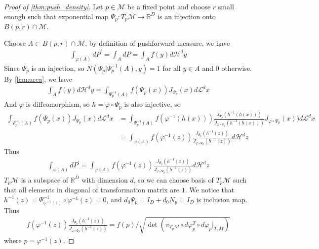 \begin{proof}[Proof of \cref{thm:push_density}]
	Let $p \in \mathcal{M}$ be a fixed point and choose $r$ small enough such that exponential map $\Psi_p: T_p \mathcal{M} \rightarrow \mathbb{R}^D$ is an injection onto $B(p,r)\cap \mathcal{M}$. 
	
	Choose $A \subset B(p,r)\cap \mathcal{M}$, by definition of pushforward measure, we have
	\begin{align*}
		\int_{\varphi(A)} d P^\prime=\int_A dP =\int_A f(y) d\mathcal{H}^d y
	\end{align*}
	Since $\Psi_p$ is an injection, so $N(\Psi_p|\Psi_p^{-1}(A),y)=1$ for all $y \in A$ and $0$ otherwise. By \cref{lem:area}, we have
	\begin{align*}
		\int_A f(y) d\mathcal{H}^d y=\int_{\Psi_p^{-1}(A)} f(\Psi_p(x)) J_{\Psi_p}(x) d \mathcal{L}^d x
	\end{align*}
	And $\varphi$ is diffeomorphism, so $h=\varphi \circ \Psi_p$ is also injective, so
	\begin{align*}
		\int_{\Psi_p^{-1}(A)} f(\Psi_p(x)) J_{\Psi_p}(x) d \mathcal{L}^d x&=\int_{\Psi_p^{-1}(A)} f(\varphi^{-1}(h(x))) \frac{J_{\Psi_p}(h^{-1}(h(x)))}{J_{\varphi \circ \Psi_p}(h^{-1}(h(x)))} J_{\varphi \circ \Psi_p}(x)) d \mathcal{L}^d x \\
		&=\int_{\varphi(A)} f(\varphi^{-1}(z)) \frac{J_{\Psi_p}(h^{-1}(z))}{J_{\varphi \circ \Psi_p}(h^{-1}(z))} d \mathcal{H}^dz
	\end{align*}
	Thus 
	\begin{align*}
		\int_{\varphi(A)} d P^\prime=\int_{\varphi(A)} f(\varphi^{-1}(z)) \frac{J_{\Psi_p}(h^{-1}(z))}{J_{\varphi \circ \Psi_p}(h^{-1}(z))} d \mathcal{H}^dz
	\end{align*}
	$T_p \mathcal{M}$ is a subspace of $\mathbb{R}^D$ with dimension $d$, so we can choose basis of $T_p \mathcal{M}$ such that all elements in diagonal of transformation matrix are $1$. We notice that $h^{-1}(z)=\Psi^{-1}_{\varphi^{-1} (z)} \circ \varphi^{-1} (z)=0$, and 
	$d_0 \Psi_p = I_D + d_0 N_p= I_D$ is inclusion map. Thus
	\begin{align*}
		f(\varphi^{-1}(z)) \frac{J_{\Psi_p}(h^{-1}(z))}{J_{\varphi \circ \Psi_p}(h^{-1}(z))}=f(p)/\sqrt{\det \left(\pi_{T_p M} \circ d\varphi_p^T \circ d\varphi_p |_{T_pM}\right)}
	\end{align*}
	where $p=\varphi^{-1}(z)$.
\end{proof}


